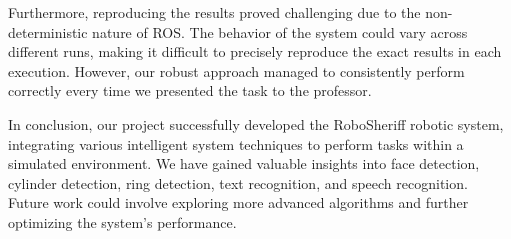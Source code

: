 \documentclass{article}
\begin{document}
Furthermore, reproducing the results proved challenging due to the non-deterministic nature of ROS. The behavior of the system could vary across different runs, making it difficult to precisely reproduce the exact results in each execution. However, our robust approach managed to consistently perform correctly every time we presented the task to the professor.

In conclusion, our project successfully developed the RoboSheriff robotic system, integrating various intelligent system techniques to perform tasks within a simulated environment. We have gained valuable insights into face detection, cylinder detection, ring detection, text recognition, and speech recognition. Future work could involve exploring more advanced algorithms and further optimizing the system's performance.
\end{document}
